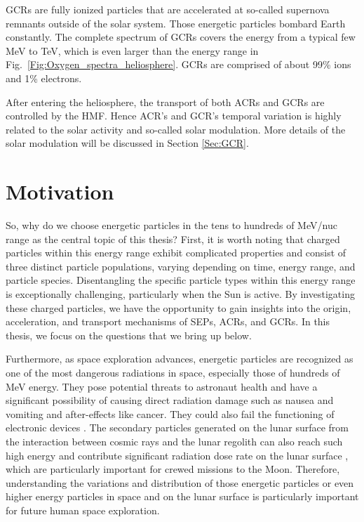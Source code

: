 \acp{GCR} are fully ionized particles that are accelerated at so-called supernova remnants \citep{Blasi2013AARv2013} outside of the solar system. Those energetic particles bombard Earth constantly. The complete spectrum of \acp{GCR} covers the energy from a typical few MeV \citep{Potgieter2013LRSP} to TeV, which is even larger than the energy range in Fig.~\ref{Fig:Oxygen_spectra_heliosphere}. \acp{GCR} are comprised of about 99\% ions and 1\% electrons.

After entering the heliosphere, the transport of both \acp{ACR} and \acp{GCR} are controlled by the \ac{HMF}. Hence \ac{ACR}'s and \ac{GCR}'s temporal variation is highly related to the solar activity and so-called solar modulation. More details of the solar modulation will be discussed in Section \ref{Sec:GCR}.









\section{Motivation}
\label{sec:Motivation}

So, why do we choose energetic particles in the tens to hundreds of MeV/nuc range as the central topic of this thesis? First, it is worth noting that charged particles within this energy range exhibit complicated properties and consist of three distinct particle populations, varying depending on time, energy range, and particle species. Disentangling the specific particle types within this energy range is exceptionally challenging, particularly when the Sun is active.
By investigating these charged particles, we have the opportunity to gain insights into the origin, acceleration, and transport mechanisms of \acp{SEP}, \acp{ACR}, and \acp{GCR}. In this thesis, we focus on the questions that we bring up below.

Furthermore, as space exploration advances, energetic particles are recognized as one of the most dangerous radiations in space, especially those of hundreds of MeV energy. They pose potential threats to astronaut health and have a significant possibility of causing direct radiation damage such as nausea and vomiting and after-effects like cancer. They could also fail the functioning of electronic devices \citep{Reames2021LNP,  mckenna2015recommendations, armstrong2014strategies}. The secondary particles generated on the lunar surface from the interaction between cosmic rays and the lunar regolith can also reach such high energy and contribute significant radiation dose rate on the lunar surface \citep{Schwadron2016Icarus}, which are particularly important for crewed missions to the Moon. Therefore, understanding the variations and distribution of those energetic particles or even higher energy particles in space and on the lunar surface is particularly important for future human space exploration.

